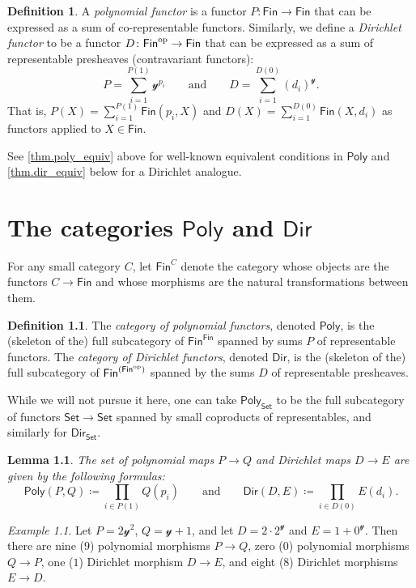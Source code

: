 \documentclass[11pt, article, one side]{memoir}
\theoremstyle{theorem}
\newtheorem{lemma}[section]{Lemma}
\theoremstyle{definition}
\newtheorem{definition}[section]{Definition}
\theoremstyle{remark}
\newtheorem{example}[section]{Example}
\newcommand{\Cat}[1]{\mathsf{#1}}%
\newcommand{\op}{^\tn{op}}
\newcommand{\tn}[1]{\textnormal{#1}}
\newcommand{\smset}{\Cat{Set}}
\newcommand{\fin}{\Cat{Fin}}
\newcommand{\yon}{\mathcal{y}}
\newcommand{\poly}{\Cat{Poly}}
\newcommand{\dir}{\Cat{Dir}}
\newcommand{\qqand}{\qquad\text{and}\qquad}
\begin{document}
\begin{definition}\label{def.poly_dir_obs}
A \emph{polynomial functor} is a functor $P\colon\fin\to\fin$ that can be expressed as a sum of co-representable functors. Similarly, we define a \emph{Dirichlet functor} to be a functor $D\colon\fin\op\to\fin$ that can be expressed as a sum of representable presheaves (contravariant functors):
\begin{equation}\label{eqn.finite_sum}
  P=\sum_{i=1}^{P(1)}\yon^{p_i}
  \qqand
  D=\sum_{i=1}^{D(0)}(d_i)^\yon.
\end{equation}
That is, $P(X)=\sum_{i=1}^{P(1)}\fin(p_i,X)$ and $D(X)=\sum_{i=1}^{D(0)}\fin(X,d_i)$ as functors applied to $X\in\fin$.
\end{definition}

See \cref{thm.poly_equiv} above for well-known equivalent conditions in $\poly$ and \cref{thm.dir_equiv} below for a Dirichlet analogue.

\chapter{The categories $\poly$ and $\dir$}

For any small category $C$, let $\fin^C$ denote the category whose objects are the functors $C\to\fin$ and whose morphisms are the natural transformations between them.
\begin{definition}\label{def.poly_dir}
The \emph{category of polynomial functors}, denoted $\poly$, is the (skeleton of the) full subcategory of $\fin^\fin$ spanned by sums $P$ of representable functors. The \emph{category of Dirichlet functors}, denoted $\dir$, is the (skeleton of the) full subcategory of $\fin^{(\fin\op)}$ spanned by the sums $D$ of representable presheaves.
\end{definition}

While we will not pursue it here, one can take $\poly_\smset$ to be the full subcategory of functors $\smset\to\smset$ spanned by small coproducts of representables, and similarly for $\dir_\smset$. 


\begin{lemma}\label{lemma.count_maps}
The set of polynomial maps $P\to Q$ and Dirichlet maps $D\to E$ are given by the following formulas:
\[
  \poly(P,Q)\coloneqq\prod_{i\in P(1)}Q(p_i)
  \qqand
  \dir(D,E)\coloneqq\prod_{i\in D(0)}E(d_i).
\]
\end{lemma}

\begin{example}
Let $P=2\yon^2$, $Q=\yon+1$, and let $D=2\cdot2^\yon$ and $E=1+0^\yon$. Then there are nine ($9$) polynomial morphisms $P\to Q$, zero ($0$) polynomial morphisms $Q\to P$, one ($1$) Dirichlet morphism $D\to E$, and eight ($8$) Dirichlet morphisms $E\to D$.
\end{example}
\end{document}
